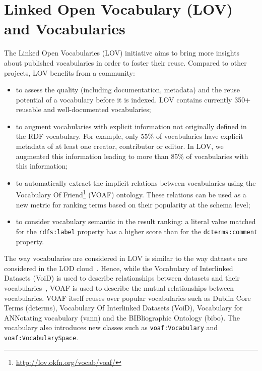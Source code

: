 \section{Linked Open Vocabulary (LOV) and Vocabularies}        \label{sec:lov-approach}
The Linked Open Vocabularies (LOV) initiative aims to bring more insights about published vocabularies in order to foster their reuse. Compared to other projects, LOV benefits from a community:
\begin{itemize}
 \item to assess the quality (including documentation, metadata) and the reuse potential of a vocabulary before it is indexed. LOV contains currently 350+ reusable and well-documented vocabularies;
 \item to augment vocabularies with explicit information not originally defined in the RDF vocabulary. For example, only 55\% of vocabularies have explicit metadata of at least one creator, contributor or editor. In LOV, we augmented this information leading to more than 85\% of vocabularies with this information;
 \item to automatically extract the implicit relations between vocabularies using the Vocabulary Of Friend\footnote{\url{http://lov.okfn.org/vocab/voaf/}} (VOAF) ontology. These relations can be used as a new metric for ranking terms based on their popularity at the schema level;
 \item to consider vocabulary semantic in the result ranking: a literal value matched for the \texttt{rdfs:label} property has a higher score than for the \texttt{dcterms:comment} property.
\end{itemize}

The way vocabularies are considered in LOV is similar to the way datasets are considered in the LOD cloud~\cite{Bizer2009}. Hence, while the Vocabulary of Interlinked Datasets (VoiD) is used to describe relationships between datasets and their vocabularies~\cite{alexander2009}, VOAF is used to describe the mutual relationships between vocabularies. VOAF itself reuses over popular vocabularies such as Dublin Core Terms (dcterms), Vocabulary Of Interlinked Datasets (VoiD), Vocabulary for ANNotating vocabulary (vann) and the BIBliographic Ontology (bibo). The vocabulary also introduces new classes such as \texttt{voaf:Vocabulary} and \texttt{voaf:VocabularySpace}.

